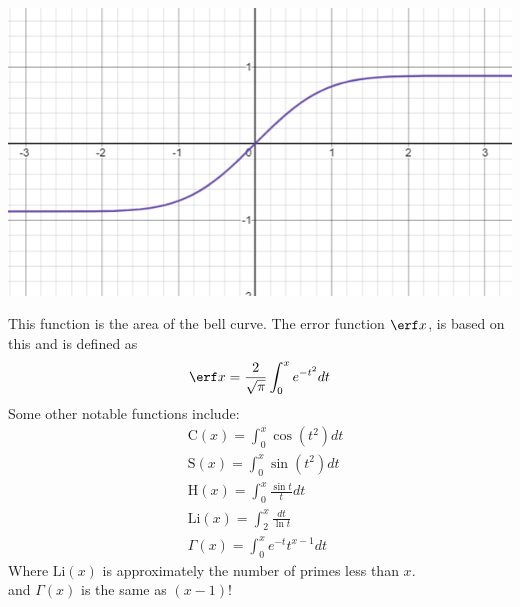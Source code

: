 \centerline{\includegraphics[scale=0.8]{Images/IntegralCalcPictures/AreaOfBellCurve.png}}
This function is the area of the bell curve. The error function $\erf x$, is based on this and is defined as
$$\erf x=\frac{2}{\sqrt{\pi}}\int_0^xe^{-t^2}dt$$
Some other notable functions include:
\begin{align*}
    &\mathrm{C}(x)=\int_0^x\cos(t^2)dt\\
    &\mathrm{S}(x)=\int_0^x\sin(t^2)dt\\
    &\mathrm{H}(x)=\int_0^x\frac{\sin t}{t}dt\\
    &\mathrm{Li}(x)=\int_2^x\frac{dt}{\ln t}\\
    &\Gamma(x)=\int_0^xe^{-t}t^{x-1}dt
\end{align*}
Where $\mathrm{Li}(x)$ is approximately the number of primes less than $x$.\\
and $\Gamma(x)$ is the same as $(x-1)!$